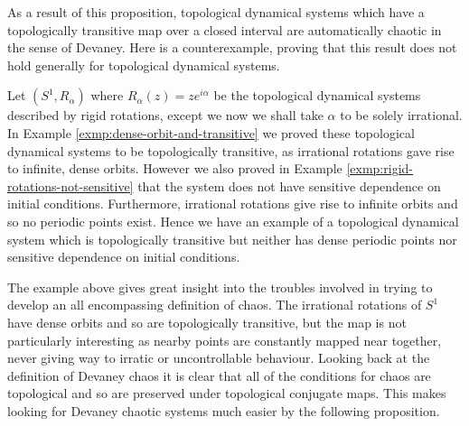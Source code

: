 As a result of this proposition, topological dynamical systems which have a topologically transitive map over a closed interval are automatically chaotic in the sense of Devaney. Here is a counterexample, proving that this result does not hold generally for topological dynamical systems.

\begin{exmp}
    Let $(S^1, R_\alpha)$ where $R_\alpha(z) = ze^{i\alpha}$ be the topological dynamical systems described by rigid rotations, except we now we shall take $\alpha$ to be solely irrational. In Example \ref{exmp:dense-orbit-and-transitive} we proved these topological dynamical systems to be topologically transitive, as irrational rotations gave rise to infinite, dense orbits. However we also proved in Example \ref{exmp:rigid-rotations-not-sensitive} that the system does not have sensitive dependence on initial conditions. Furthermore, irrational rotations give rise to infinite orbits and so no periodic points exist. Hence we have an example of a topological dynamical system which is topologically transitive but neither has dense periodic points nor sensitive dependence on initial conditions.
\end{exmp}

The example above gives great insight into the troubles involved in trying to develop an all encompassing definition of chaos. The irrational rotations of $S^1$ have dense orbits and so are topologically transitive, but the map is not particularly interesting as nearby points are constantly mapped near together, never giving way to irratic or uncontrollable behaviour. Looking back at the definition of Devaney chaos it is clear that all of the conditions for chaos are topological and so are preserved under topological conjugate maps. This makes looking for Devaney chaotic systems much easier by the following proposition.

